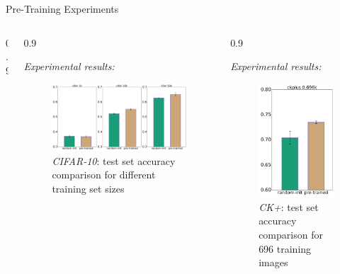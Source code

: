 \documentclass[final]{beamer}
\newlength{\onecolwid}
\newlength{\threecolwid}
\begin{document}
\begin{frame}[t]
\begin{columns}[t]
\begin{column}{\threecolwid}
\begin{alertblock}{Pre-Training Experiments}
\begin{columns}[t, totalwidth=0.9\threecolwid]
\begin{column}{0.9\onecolwid}
\begin{block}{}
\end{block}
\end{column}
\begin{column}{0.9\onecolwid}
\begin{block}{}
\emph{Experimental results:}

\begin{figure}
\includegraphics[width=\linewidth]{box_plots/boxplots_cifar.png}
\caption{\emph{CIFAR-10}: test set accuracy comparison for different training set sizes}
\end{figure}

\end{block}
\end{column}

\begin{column}{0.9\onecolwid}
\begin{block}{}
\emph{Experimental results:}

\begin{figure}
\centering
\includegraphics[width=0.33\linewidth]{box_plots/boxplots_ckplus.png}
\caption{\emph{CK+}: test set accuracy comparison for 696 training images}
\end{figure}

\end{block}



\end{column}
\end{columns}
\end{alertblock}
\end{column}
\end{columns}
\end{frame}
\end{document}
